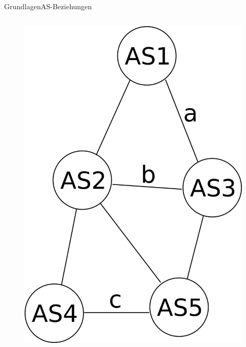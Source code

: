 \documentclass[ngerman,compress,hyperref={bookmarks}]{beamer}
\begin{document}
\begin{frame}[allowframebreaks]{Grundlagen}{AS-Beziehungen}
\begin{columns}[c]
\begin{column}{0.25\textwidth}
\begin{figure}
        \includegraphics[width=1\textwidth]{images/Routingbeziehungen}
      \end{figure}
    \end{column}
  \end{columns}




\end{frame}
\end{document}
